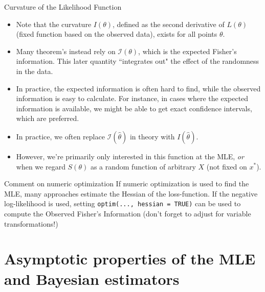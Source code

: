\begin{frame}[allowframebreaks]{Curvature of the Likelihood Function}
\begin{itemize}
  \framebreak
  \item Note that the curvature $I(\theta)$, defined as the second derivative of $L(\theta)$ (fixed function based on the observed data), exists for all points $\theta$.
  \item Many theorem's instead rely on $\mathcal{I}(\theta)$, which is the \alert{expected} Fisher's information. This later quantity ``integrates out" the effect of the randomness in the data.
  \item In practice, the expected information is often hard to find, while the observed information is easy to calculate. For instance, in cases where the expected information is available, we might be able to get \alert{exact} confidence intervals, which are preferred.
  \item In practice, we often replace $\mathcal{I}(\hat{\theta})$ in theory with $I(\hat{\theta})$.
  \item However, we're primarily only interested in this function at the MLE, \emph{or} when we regard $S(\theta)$ as a random function of arbitrary $X$ (not fixed on $x^*$).



\end{itemize}

\framebreak


\begin{exampleblock}{Comment on numeric optimization}
  If numeric optimization is used to find the MLE, many approaches estimate the Hessian of the loss-function. If the negative log-likelihood is used, setting \texttt{optim(..., hessian = TRUE)} can be used to compute the Observed Fisher's Information (don't forget to adjust for variable transformations!)
\end{exampleblock}

\end{frame}

\section{Asymptotic properties of the MLE and Bayesian estimators}

